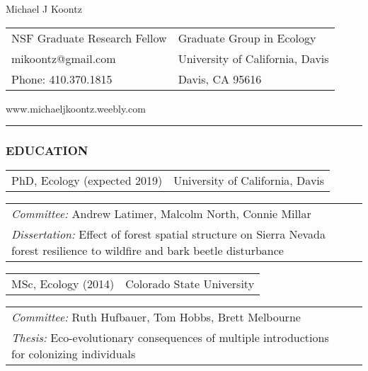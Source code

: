 \documentclass[11pt,english]{article}
\providecommand{\tabularnewline}{\\}
\begin{document}
\begin {center}
{\huge Michael J Koontz}\tabularnewline
\vspace{1em}

\begin{tabular}{>{\raggedright}p{3in}>{\raggedleft}p{3in}}
NSF Graduate Research Fellow & Graduate Group in Ecology\tabularnewline
mikoontz@gmail.com & University of California, Davis\tabularnewline
Phone: 410.370.1815 & Davis, CA 95616\tabularnewline
\end{tabular}
www.michaeljkoontz.weebly.com
\end{center}
\vspace{-1.5em}

\rule[0.5ex]{1\columnwidth}{0.5pt}


\vspace{0.5ex}
\subsubsection*{EDUCATION}
\vspace{-0.5ex}

\begin{tabular}{>{\raggedright}p{4in}>{\raggedleft}p{2in}}
PhD, Ecology (expected 2019) & University of California, Davis\tabularnewline
\end{tabular}

\hspace{1.0em}
\begin{tabular}{p{6in}p{0in}}
\emph{Committee:} Andrew Latimer, Malcolm North, Connie Millar & \tabularnewline
\emph{Dissertation:} Effect of forest spatial structure on Sierra Nevada forest resilience to wildfire and bark beetle disturbance &
\end{tabular}

\vspace{0.5ex}

\begin{tabular}{>{\raggedright}p{4in}>{\raggedleft}p{2in}}
MSc, Ecology (2014) & Colorado State University\tabularnewline
\end{tabular}

\hspace{1.0em}
\begin{tabular}{p{6in}p{0in}}
\emph{Committee:} Ruth Hufbauer, Tom Hobbs, Brett Melbourne & \tabularnewline
\emph{Thesis:} Eco-evolutionary consequences of multiple introductions for colonizing individuals &
\end{tabular}
\end{document}
